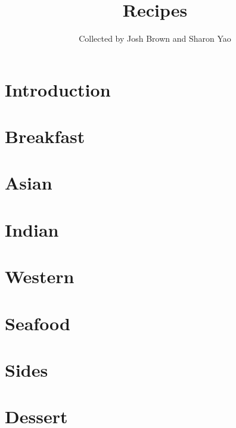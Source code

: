 \documentclass[twoside, 10pt]{book}
\title{\bf \Huge Recipes}
\author{Collected by Josh Brown and Sharon Yao}
\date{}
\begin{document}
\maketitle
\tableofcontents{}

\chapter*{Introduction}
    

\chapter{Breakfast}
    
    
    
    
    
    

\chapter{Asian}
    
    
    
    

\chapter{Indian}
    
    
    
    

\chapter{Western}
    
    
    

\chapter{Seafood}
    
    
    
    
    
    
    

\chapter{Sides}
    
    
    

\chapter{Dessert}
    
    
    
    
    
    
    
\end{document}
